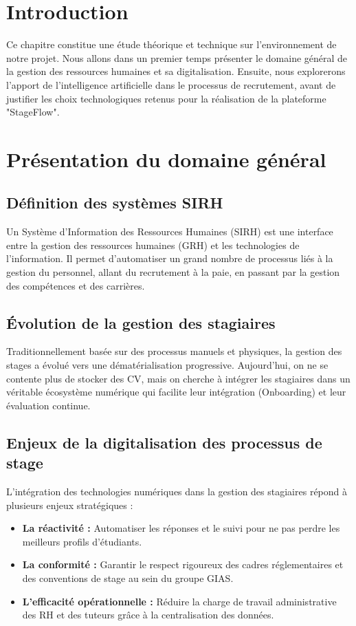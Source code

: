 
\section{Introduction}
Ce chapitre constitue une étude théorique et technique sur l'environnement de notre projet. Nous allons dans un premier temps présenter le domaine général de la gestion des ressources humaines et sa digitalisation. Ensuite, nous explorerons l'apport de l'intelligence artificielle dans le processus de recrutement, avant de justifier les choix technologiques retenus pour la réalisation de la plateforme "StageFlow".

\section{Présentation du domaine général}
\subsection{Définition des systèmes SIRH}
Un Système d'Information des Ressources Humaines (SIRH) est une interface entre la gestion des ressources humaines (GRH) et les technologies de l'information. Il permet d'automatiser un grand nombre de processus liés à la gestion du personnel, allant du recrutement à la paie, en passant par la gestion des compétences et des carrières.

\subsection{Évolution de la gestion des stagiaires}
Traditionnellement basée sur des processus manuels et physiques, la gestion des stages a évolué vers une dématérialisation progressive. Aujourd'hui, on ne se contente plus de stocker des CV, mais on cherche à intégrer les stagiaires dans un véritable écosystème numérique qui facilite leur intégration (Onboarding) et leur évaluation continue.

\subsection{Enjeux de la digitalisation des processus de stage}
L'intégration des technologies numériques dans la gestion des stagiaires répond à plusieurs enjeux stratégiques :
\begin{itemize}
    \item \textbf{La réactivité :} Automatiser les réponses et le suivi pour ne pas perdre les meilleurs profils d'étudiants.
    \item \textbf{La conformité :} Garantir le respect rigoureux des cadres réglementaires et des conventions de stage au sein du groupe GIAS.
    \item \textbf{L'efficacité opérationnelle :} Réduire la charge de travail administrative des RH et des tuteurs grâce à la centralisation des données.
\end{itemize}

